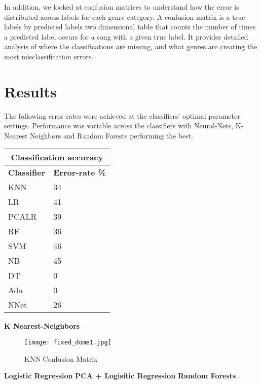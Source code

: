 \documentclass{article}
\begin{document}
\begin{multicols}{2}
In addition, we looked at confusion matrices to understand how the error is distributed across labels for each genre category. A confusion matrix is a true labels by predicted labels two dimensional table that counts the number of times a predicted label occurs for a song with a given true label. It provides detailed analysis of where the classifications are missing, and what genres are creating the most misclassification errors.
\section{Results}
\newline
\newline
The following error-rates were achieved at the classifiers' optimal parameter settings. Performance was variable across the classifiers with Neural-Nets, K-Nearest Neighbors and Random Forests performing the best. 
\newline
\newline
\begin{tabular}{ |p{2cm}|p{2.3cm}|}
\hline
\multicolumn{2}{|c|}{\textbf{Classification accuracy}} \\
\hline
\textbf{Classifier} & \textbf{Error-rate \%} \\
\hline
KNN & 34 \\
LR & 41  \\
PCALR & 39 \\
RF    &  36 \\
SVM & 46 \\
NB & 45 \\
DT & 0 \\
Ada & 0 \\
NNet & 26 \\
\hline
\end{tabular}
\newline
\newline
\newline
\textbf{K Nearest-Neighbors}  
\begin{figure}[ht!]
\centering
\texttt{[image: fixed\_dome1.jpg]}
\caption{KNN Confusion Matrix \label{overflow}}
\end{figure}
\newline
\newline
\textbf{Logistic Regression}
\newline
\newline
\textbf{PCA + Logisitic Regression} 
\newline
\newline
\textbf{Random Forests}

\end{multicols}
\end{document}
